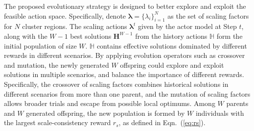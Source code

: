\documentclass[letterpaper]{article} %
\newcommand\blue[1]{\textcolor{blue}{#1}}
\newcommand\rbb[1]{\textcolor{red}{\{RB: #1\}}}
\newcommand\rjf[1]{\textcolor{red}{\{RJF: #1\}}}
\newcommand\qz[1]{\textcolor{blue}{\{QZ: #1\}}}
\begin{document}


The proposed evolutionary strategy is designed to better explore and exploit the feasible action space. 
Specifically, denote $\bm{\lambda} = \{\lambda_i\}_{i=1}^{N}$ as the set of scaling factors for $N$ cluster regions. 
The scaling actions %
$\bm{\lambda}^{t}$ given by the actor model at Step $t$, along with the $W-1$ best solutions $\bm{H}^{W-1}$ from the history actions $\mathbb{H}$ form the initial population of size $W$. $\mathbb{H}$ contains effective solutions dominated by different rewards in different scenarios. By applying evolution operators such as crossover and mutation, the newly generated $W$ offspring could explore and exploit solutions in multiple scenarios, and balance the importance of different rewards. %
Specifically, the crossover of scaling factors %
combines historical solutions in different scenarios from more than one parent, and the mutation of scaling factors allows broader trials and escape from possible local optimums. %
Among $W$ parents and $W$ generated offspring, %
the new population is formed by $W$ individuals with the largest scale-consistency reward $r_s$, as defined in Eqn.~(\ref{eq:rs}). %
\end{document}
